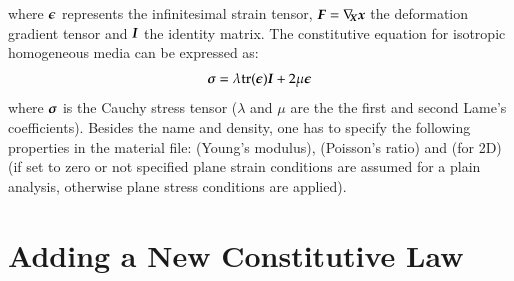 where $\boldsymbol{\epsilon}$ represents the infinitesimal strain tensor,
$\boldsymbol{F} = \nabla_{\!\!\boldsymbol{X}}\boldsymbol{x}$ the deformation gradient
tensor and $\boldsymbol{I}$ the identity matrix. The constitutive equation
for isotropic homogeneous media can be expressed as:
\begin{equation}
\label{eqn:smm:material:constitutive_elastic}
\boldsymbol{\sigma } =\lambda\mathrm{tr}(\boldsymbol{\epsilon})\boldsymbol{I}+2 \mu\boldsymbol{\epsilon}
\end{equation}
where $\boldsymbol{\sigma}$ is the Cauchy stress tensor
($\lambda$ and $\mu$ are the the first and second Lame's
coefficients). Besides the name and density, one has to specify the
following properties in the material file:  (Young's modulus),
 (Poisson's ratio) and (for 2D)  (if set
to zero or not specified plane strain conditions are assumed for a
plain analysis, otherwise plane stress conditions are applied).




\section{Adding a New Constitutive Law}

